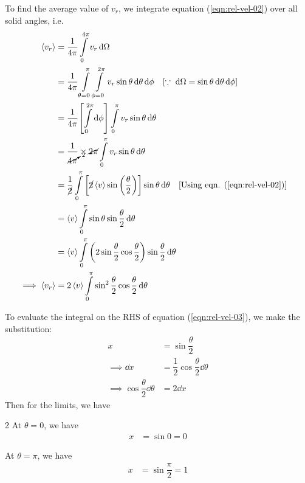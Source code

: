 			To find the average value of $v_r$, we integrate equation (\ref{eqn:rel-vel-02}) over all solid angles, i.e.
			\begin{align}
				\expval{v_r}&=\dfrac{1}{4\pi}\int\limits_{0}^{4\pi}{v_r\dd{\Omega}} \nonumber\\
					&=\dfrac{1}{4\pi}\int\limits_{\theta=0}^{\pi}\int\limits_{\phi=0}^{2\pi}{v_r\sin{\theta}\dd{\theta}\dd{\phi}}\qq{[$\because\;\dd{\Omega}=\sin{\theta}\dd{\theta}\dd{\phi}$]} \nonumber\\
					&=\dfrac{1}{4\pi}\qty[\int\limits_{0}^{2\pi}{\dd{\phi}}]\int\limits_{0}^{\pi}{v_r\sin{\theta}\dd{\theta}} \nonumber\\
					&=\dfrac{1}{\cancelto{2}{4\pi}}\times \cancel{2\pi}\int\limits_{0}^{\pi}{v_r\sin{\theta}\dd{\theta}} \nonumber\\
					&=\dfrac{1}{\cancel{2}}\int\limits_{0}^{\pi}{\qty[\cancel{2}\expval{v}\sin\qty(\dfrac{\theta}{2})]\sin{\theta}\dd{\theta}}\qq{[Using eqn. (\ref{eqn:rel-vel-02})]} \nonumber\\
					&=\expval{v}\int\limits_{0}^{\pi}{\sin{\theta}\sin{\dfrac{\theta}{2}}\dd{\theta}} \nonumber\\
					&=\expval{v}\int\limits_{0}^{\pi}{\qty(2\sin{\dfrac{\theta}{2}}\cos{\dfrac{\theta}{2}})\sin{\dfrac{\theta}{2}}\dd{\theta}} \nonumber\\
				\implies \expval{v_r}&=2\expval{v}\int\limits_{0}^{\pi}{\sin^2{\dfrac{\theta}{2}}\cos{\dfrac{\theta}{2}}\dd{\theta}} \label{eqn:rel-vel-03}
			\end{align}
			
			To evaluate the integral on the RHS of equation (\ref{eqn:rel-vel-03}), we make the substitution:
			\begin{align*}
				x&=\sin{\dfrac{\theta}{2}} \\
				\implies\dd{x}&=\dfrac{1}{2}\cos{\dfrac{\theta}{2}}\dd{\theta} \\
				\implies\cos{\dfrac{\theta}{2}}\dd{\theta}&=2\dd{x}
			\end{align*}
			Then for the limits, we have
			\begin{multicols}{2}
				At $\theta=0$, we have\vspace{-2ex}
				\begin{align*}
					x&=\sin{0}=0
				\end{align*}
				
				At $\theta=\pi$, we have\vspace{-2ex}
				\begin{align*}
					x&=\sin{\dfrac{\pi}{2}}=1
				\end{align*}
			\end{multicols}
			
